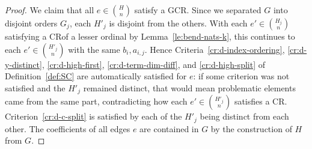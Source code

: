 \documentclass[11pt]{article}
\newcommand{\crulenospace}{CR}
\newcommand{\gencrulenospace}{GCR}
\newcommand{\idegr}{j}
\theoremstyle{plain}
\theoremstyle{definition}
\begin{document}
\begin{proof}
We claim that all $e \in \binom{H}{n}$ satisfy a \gencrulenospace. Since we separated $G$ into disjoint orders $G_{\idegr}$, each $H'_{\idegr}$ is disjoint from the others.
With each $e' \in \binom{H_j}{n}$
satisfying a \crulenospace of a lesser ordinal by Lemma~\ref{le:bend-nats-k},
this continues to each $e' \in \binom{H'_j}{n}$ with the same $b_i, a_{i,j}$.
Hence
Criteria~\ref{cr:d-index-ordering}, \ref{cr:d-y-distinct}, \ref{cr:d-high-first},
\ref{cr:d-term-dim-diff}, and \ref{cr:d-high-split} of Definition~\ref{def:SC} are automatically satisfied for
$e$: if some
criterion was not satisfied and the $H'_{\idegr}$ remained distinct, that would
mean problematic elements came from the same part, contradicting how each $e' \in \binom{H'_j}{n}$
satisfies a \crulenospace.
Criterion~\ref{cr:d-c-split} is satisfied by each of the
$H'_{\idegr}$ being distinct from each other.
The coefficients of all edges $e$ are contained in $G$ by the construction of $H$ from $G$.
\end{proof}
\end{document}
